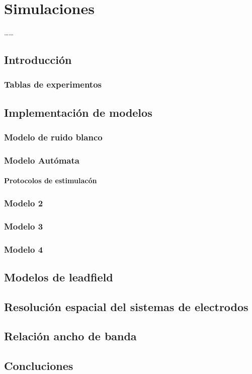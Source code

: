 \chapter{Simulaciones}
\begin{resumen}
\ldots\ldots


\end{resumen}

\section{Introducción}

\subsection{Tablas de experimentos}

\section{Implementación de modelos}
\subsection{Modelo de ruido blanco}
\subsection{Modelo Autómata}
\subsubsection{Protocolos de estimulacón}
\subsection{Modelo 2}
\subsection{Modelo 3}
\subsection{Modelo 4}

\section{Modelos de leadfield}

\section{Resolución espacial del sistemas de electrodos}
\section{Relación ancho de banda}


\section{Concluciones}
